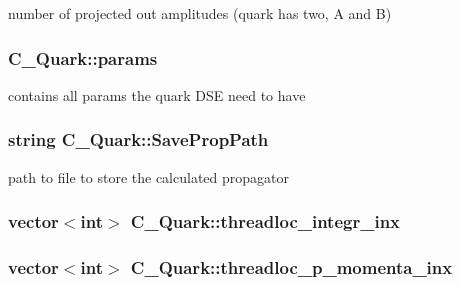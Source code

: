 number of projected out amplitudes (quark has two, A and B) 

\hypertarget{class_c___quark_aa973622070edbcb2e2e8bf12425a4277}{
\subsubsection[{params}]{ C\-\_\-\-Quark\-::params\hspace{0.3cm}{\ttfamily [protected]}}}\label{class_c___quark_aa973622070edbcb2e2e8bf12425a4277}


contains all params the quark D\-S\-E need to have 

\hypertarget{class_c___quark_a6658a59e332c14057398ba12ad2eb36b}{
\subsubsection[{Save\-Prop\-Path}]{\setlength{\rightskip}{0pt plus 5cm}string C\-\_\-\-Quark\-::\-Save\-Prop\-Path\hspace{0.3cm}{\ttfamily [protected]}}}\label{class_c___quark_a6658a59e332c14057398ba12ad2eb36b}


path to file to store the calculated propagator 

\hypertarget{class_c___quark_a96dfb638401816915fc1728cb4587f2a}{
\subsubsection[{threadloc\-\_\-integr\-\_\-inx}]{\setlength{\rightskip}{0pt plus 5cm}vector$<$int$>$ C\-\_\-\-Quark\-::threadloc\-\_\-integr\-\_\-inx\hspace{0.3cm}{\ttfamily [protected]}}}\label{class_c___quark_a96dfb638401816915fc1728cb4587f2a}
\hypertarget{class_c___quark_a16276524396db70cf500004e4732b62e}{
\subsubsection[{threadloc\-\_\-p\-\_\-momenta\-\_\-inx}]{\setlength{\rightskip}{0pt plus 5cm}vector$<$int$>$ C\-\_\-\-Quark\-::threadloc\-\_\-p\-\_\-momenta\-\_\-inx\hspace{0.3cm}{\ttfamily [protected]}}}\label{class_c___quark_a16276524396db70cf500004e4732b62e}


